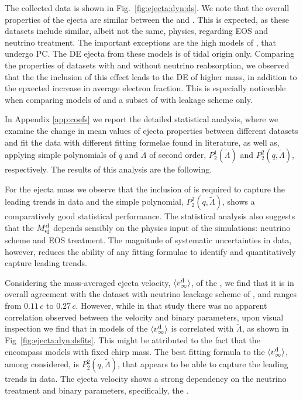The collected data is shown in Fig.~\ref{fig:ejecta:dyn:ds}. We note that the overall properties of the 
ejecta are similar between the \DSrefset{} and \DSheatcool{}. This is expected, as these 
datasets include similar, albeit not the same, physics, regarding \ac{EOS} and neutrino treatment.
%
The important exceptions are the high \mr{} models of \DSrefset{}, 
that undergo \ac{PC}. The \ac{DE} ejecta from these models is of tidal origin only. 
%
Comparing the properties of datasets with and without neutrino reabsorption, we observed 
that the the inclusion of this effect leads to the \ac{DE} of higher mass, in addition to 
the epxected increase in average electron fraction. This is especially noticeable when 
comparing models of \DSrefset{} and a subset of \citet{Radice:2018pdn} with leakage scheme only.


In Appendix \ref{app:coefs} we report the detailed statistical analysis, where we examine the 
change in mean values of ejecta properties between different datasets and fit the 
data with different fitting formelae found in literature, as well as, applying simple 
polynomials of $q$ and $\tilde{\Lambda}$ of second order,
$P_2^1(\tilde{\Lambda})$ and $P_2^2(q,\tilde{\Lambda})$, respectively. 
The results of this analysis are the following. 

For the ejecta mass we observe that the inclusion of \mr{} is required 
to capture the leading trends in data and the simple polynomial, 
$P_2^2(q,\tilde{\Lambda})$, shows a comparatively good statistical performance.
%
The statistical analysis also suggests that the $M^{\text{d}}_{\text{ej}}$ depends 
sensibly on the physics input of the simulations: neutrino scheme and \ac{EOS} treatment.
%
The magnitude of systematic uncertainties in data, however, reduces the ability of any 
fitting formulae to identify and quantitatively capture leading trends.
%

Considering the mass-averaged ejecta velocity, $\langle v^{\text{d}}_\infty\rangle$, of the \DSrefset{}, we 
find that it is in overall agreement with the dataset with neutrino leackage scheme 
of \citet{Radice:2018pdn}, and ranges from $0.11\, c$ to $0.27\, c$. However, while in 
that study there was no apparent correlation observed between the velocity and binary 
parameters, upon visual inspection we find that in models of \DSrefset{} the $\langle v^{\text{d}}_\infty\rangle$ 
is correlated with $\tilde{\Lambda}$, as shown in Fig~\ref{fig:ejecta:dyn:dsfits}.
This might be attributed to the fact that the \DSrefset{} encompass models with fixed 
chirp mass. 
%
The best fitting formula to the $\langle v^{\text{d}}_\infty\rangle$, among considered, is $P_2^2(q,\tilde\Lambda)$, 
that appears to be able to capture the leading trends in data. 
%
The ejecta velocity shows a strong dependency on the neutrino treatment 
and binary parameters, specifically, the \mr{}.

